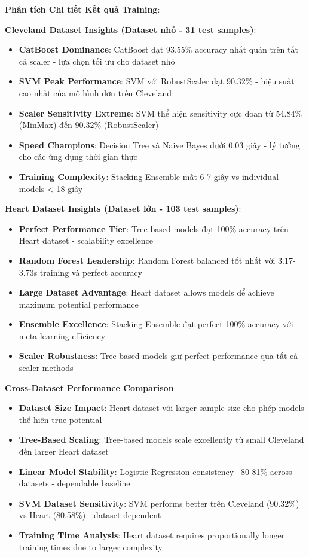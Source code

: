 \textbf{Phân tích Chi tiết Kết quả Training}:

\textbf{Cleveland Dataset Insights (Dataset nhỏ - 31 test samples)}:
\begin{itemize}
    \item \textbf{CatBoost Dominance}: CatBoost đạt 93.55\% accuracy nhất quán trên tất cả scaler - lựa chọn tối ưu cho dataset nhỏ
    \item \textbf{SVM Peak Performance}: SVM với RobustScaler đạt 90.32\% - hiệu suất cao nhất của mô hình đơn trên Cleveland
    \item \textbf{Scaler Sensitivity Extreme}: SVM thể hiện sensitivity cực đoan từ 54.84\% (MinMax) đến 90.32\% (RobustScaler)
    \item \textbf{Speed Champions}: Decision Tree và Naive Bayes dưới 0.03 giây - lý tưởng cho các ứng dụng thời gian thực
    \item \textbf{Training Complexity}: Stacking Ensemble mất 6-7 giây vs individual models < 18 giây
\end{itemize}

\textbf{Heart Dataset Insights (Dataset lớn - 103 test samples)}:
\begin{itemize}
    \item \textbf{Perfect Performance Tier}: Tree-based models đạt 100\% accuracy trên Heart dataset - scalability excellence
    \item \textbf{Random Forest Leadership}: Random Forest balanced tốt nhất với 3.17-3.73s training và perfect accuracy
    \item \textbf{Large Dataset Advantage}: Heart dataset allows models để achieve maximum potential performance
    \item \textbf{Ensemble Excellence}: Stacking Ensemble đạt perfect 100\% accuracy với meta-learning efficiency
    \item \textbf{Scaler Robustness}: Tree-based models giữ perfect performance qua tất cả scaler methods
\end{itemize}

\textbf{Cross-Dataset Performance Comparison}:
\begin{itemize}
    \item \textbf{Dataset Size Impact}: Heart dataset với larger sample size cho phép models thể hiện true potential
    \item \textbf{Tree-Based Scaling}: Tree-based models scale excellently từ small Cleveland đến larger Heart dataset
    \item \textbf{Linear Model Stability}: Logistic Regression consistency ~80-81\% across datasets - dependable baseline
    \item \textbf{SVM Dataset Sensitivity}: SVM performs better trên Cleveland (90.32\%) vs Heart (80.58\%) - dataset-dependent
    \item \textbf{Training Time Analysis}: Heart dataset requires proportionally longer training times due to larger complexity
\end{itemize}

